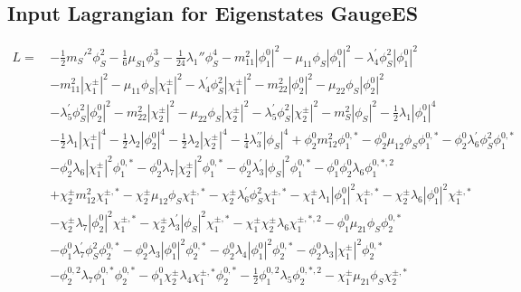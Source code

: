 \subsection{Input Lagrangian for Eigenstates GaugeES} 
\begin{align} 
L = \, & -\frac{1}{2} {m_{S}'}^2 \phi_{S}^{2} -\frac{1}{6} \mu_{S1} \phi_{S}^{3} -\frac{1}{24} \lambda_1'' \phi_{S}^{4} - m^2_{11} |\phi_1^0|^2 - \mu_{11} \phi_S |\phi_1^0|^2 - \lambda^{\prime}_4 \phi_{S}^{2} |\phi_1^0|^2 \nonumber \\ 
 &- m^2_{11} |\chi_1^\pm|^2 - \mu_{11} \phi_S |\chi_1^\pm|^2 - \lambda^{\prime}_4 \phi_{S}^{2} |\chi_1^\pm|^2 - m^2_{22} |\phi_2^0|^2 - \mu_{22} \phi_S |\phi_2^0|^2 \nonumber \\ 
 &- \lambda^{\prime}_5 \phi_{S}^{2} |\phi_2^0|^2 - m^2_{22} |\chi_2^\pm|^2 - \mu_{22} \phi_S |\chi_2^\pm|^2 - \lambda^{\prime}_5 \phi_{S}^{2} |\chi_2^\pm|^2 - m_{S}^2 |\phi_S|^2 -\frac{1}{2} \lambda_1 |\phi_1^0|^4 \nonumber \\ 
 &-\frac{1}{2} \lambda_1 |\chi_1^\pm|^4 -\frac{1}{2} \lambda_2 |\phi_2^0|^4 -\frac{1}{2} \lambda_2 |\chi_2^\pm|^4 -\frac{1}{4} \lambda^{\prime\prime}_3 |\phi_S|^4 +\phi_2^0 m^2_{12} \phi_1^{0,*} - \phi_2^0 \mu_{12} \phi_S \phi_1^{0,*} - \phi_2^0 \lambda^{\prime}_6 \phi_{S}^{2} \phi_1^{0,*} \nonumber \\ 
 &- \phi_2^0 \lambda_6 |\chi_1^\pm|^2 \phi_1^{0,*} - \phi_2^0 \lambda_7 |\chi_2^\pm|^2 \phi_1^{0,*} - \phi_2^0 \lambda^{\prime}_3 |\phi_S|^2 \phi_1^{0,*} - \phi_1^0 \phi_2^0 \lambda_6 \phi_{1}^{0,*,2} \nonumber \\ 
 &+\chi_2^\pm m^2_{12} \chi_1^{\pm,*} - \chi_2^\pm \mu_{12} \phi_S \chi_1^{\pm,*} - \chi_2^\pm \lambda^{\prime}_6 \phi_{S}^{2} \chi_1^{\pm,*} - \chi_1^\pm \lambda_1 |\phi_1^0|^2 \chi_1^{\pm,*} - \chi_2^\pm \lambda_6 |\phi_1^0|^2 \chi_1^{\pm,*} \nonumber \\ 
 &- \chi_2^\pm \lambda_7 |\phi_2^0|^2 \chi_1^{\pm,*} - \chi_2^\pm \lambda^{\prime}_3 |\phi_S|^2 \chi_1^{\pm,*} - \chi_1^\pm \chi_2^\pm \lambda_6 \chi_{1}^{\pm,*,2} - \phi_1^0 \mu_{21} \phi_S \phi_2^{0,*} \nonumber \\ 
 &- \phi_1^0 \lambda^{\prime}_7 \phi_{S}^{2} \phi_2^{0,*} - \phi_2^0 \lambda_3 |\phi_1^0|^2 \phi_2^{0,*} - \phi_2^0 \lambda_4 |\phi_1^0|^2 \phi_2^{0,*} - \phi_2^0 \lambda_3 |\chi_1^\pm|^2 \phi_2^{0,*} \nonumber \\ 
 &- \phi_{2}^{0,2} \lambda_7 \phi_1^{0,*} \phi_2^{0,*} - \phi_1^0 \chi_2^\pm \lambda_4 \chi_1^{\pm,*} \phi_2^{0,*} -\frac{1}{2} \phi_{1}^{0,2} \lambda_5 \phi_{2}^{0,*,2} - \chi_1^\pm \mu_{21} \phi_S \chi_2^{\pm,*} \nonumber \\ 

\end{align}
